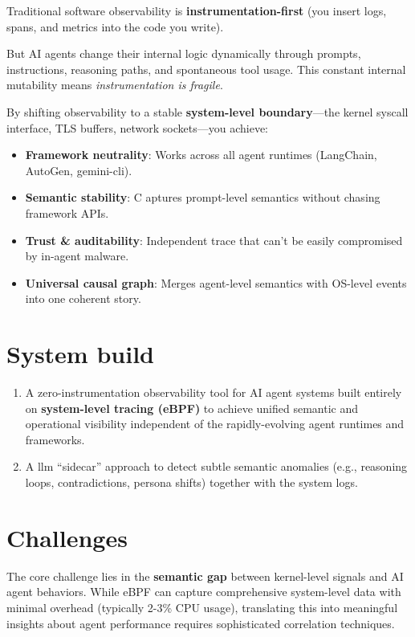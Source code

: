 \documentclass[sigplan,screen，review,9pt]{acmart}
\begin{document}
Traditional software observability is \textbf{instrumentation-first} (you insert logs, spans, and metrics into the code you write).

But AI agents change their internal logic dynamically through prompts, instructions, reasoning paths, and spontaneous tool usage. This constant internal mutability means \emph{instrumentation is fragile}.

By shifting observability to a stable \textbf{system-level boundary}—the kernel syscall interface, TLS buffers, network sockets—you achieve:

\begin{itemize}
  \item \textbf{Framework neutrality}: Works across all agent runtimes (LangChain, AutoGen, gemini-cli).
  \item \textbf{Semantic stability}: C aptures prompt-level semantics without chasing framework APIs.
  \item \textbf{Trust \& auditability}: Independent trace that can’t be easily compromised by in-agent malware.
  \item \textbf{Universal causal graph}: Merges agent-level semantics with OS-level events into one coherent story.
\end{itemize}


\section*{System build}

\begin{enumerate}
  \item A zero-instrumentation observability tool for AI agent systems built entirely on \textbf{system-level tracing (eBPF)} to achieve unified semantic and operational visibility independent of the rapidly-evolving agent runtimes and frameworks.
  \item A llm ``sidecar'' approach to detect subtle semantic anomalies (e.g., reasoning loops, contradictions, persona shifts) together with the system logs.
\end{enumerate}

\section*{Challenges}

The core challenge lies in the \textbf{semantic gap} between kernel-level signals and AI agent behaviors. While eBPF can capture comprehensive system-level data with minimal overhead (typically 2-3\% CPU usage), translating this into meaningful insights about agent performance requires sophisticated correlation techniques.
\end{document}
